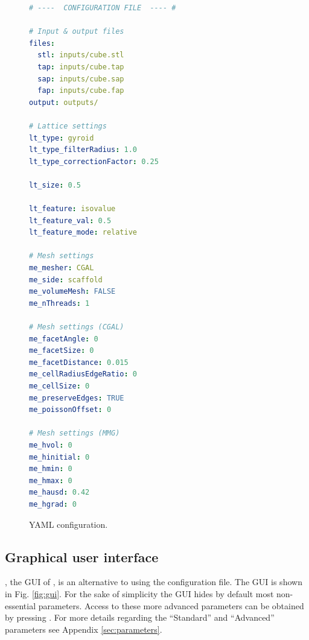\begin{figure}[htb]
\centering
\begin{minipage}{.9\linewidth}
%
\begin{lstlisting}[language=yaml]
# ----  CONFIGURATION FILE  ---- #

# Input & output files
files:
  stl: inputs/cube.stl
  tap: inputs/cube.tap
  sap: inputs/cube.sap
  fap: inputs/cube.fap
output: outputs/

# Lattice settings
lt_type: gyroid
lt_type_filterRadius: 1.0
lt_type_correctionFactor: 0.25

lt_size: 0.5

lt_feature: isovalue
lt_feature_val: 0.5
lt_feature_mode: relative

# Mesh settings
me_mesher: CGAL
me_side: scaffold
me_volumeMesh: FALSE
me_nThreads: 1

# Mesh settings (CGAL)
me_facetAngle: 0
me_facetSize: 0
me_facetDistance: 0.015
me_cellRadiusEdgeRatio: 0
me_cellSize: 0
me_preserveEdges: TRUE
me_poissonOffset: 0

# Mesh settings (MMG)
me_hvol: 0
me_hinitial: 0
me_hmin: 0
me_hmax: 0
me_hausd: 0.42
me_hgrad: 0
\end{lstlisting}
\end{minipage}

	\caption{YAML configuration.}
	\label{fig:config}
\end{figure}

\subsection{Graphical user interface}
\qasli{}, the GUI of \asli{}, is an alternative to using the configuration file. The GUI is shown in Fig. \ref{fig:gui}.  For the sake of simplicity the GUI hides by default most non-essential parameters. Access to these more advanced parameters can be obtained by pressing . For more details regarding the ``Standard'' and ``Advanced'' parameters see Appendix \ref{sec:parameters}.

